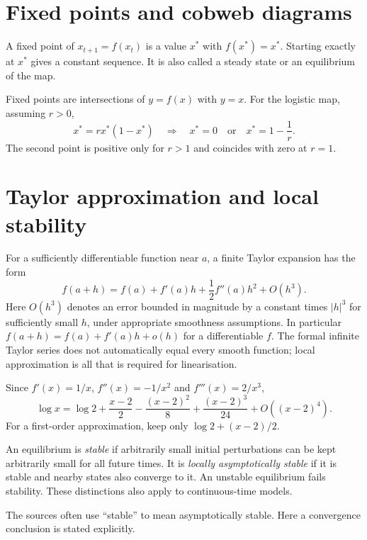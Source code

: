 \section{Fixed points and cobweb diagrams}
\begin{definition}
A fixed point of $x_{t+1}=f(x_t)$ is a value $x^*$ with $f(x^*)=x^*$.
Starting exactly at $x^*$ gives a constant sequence. It is also called a
steady state or an equilibrium of the map.
\end{definition}
Fixed points are intersections of $y=f(x)$ with $y=x$.
For the logistic map, assuming $r>0$,
\[
x^*=rx^*(1-x^*)\quad\Longrightarrow\quad
x^*=0\quad\text{or}\quad x^*=1-\frac1r.
\]
The second point is positive only for $r>1$ and coincides with zero at $r=1$.



\section{Taylor approximation and local stability}
For a sufficiently differentiable function near $a$, a finite Taylor expansion
has the form
\[
f(a+h)=f(a)+f'(a)h+\frac12f''(a)h^2+O(h^3).
\]
Here $O(h^3)$ denotes an error bounded in magnitude by a constant times
$|h|^3$ for sufficiently small $h$, under appropriate smoothness assumptions.
In particular $f(a+h)=f(a)+f'(a)h+o(h)$ for a differentiable $f$.
The formal infinite Taylor series does not automatically equal every smooth
function; local approximation is all that is required for linearisation.

\begin{example}
Since $f'(x)=1/x$, $f''(x)=-1/x^2$ and $f'''(x)=2/x^3$,
\[
\log x=\log2+\frac{x-2}{2}-\frac{(x-2)^2}{8}
+\frac{(x-2)^3}{24}+O((x-2)^4).
\]
For a first-order approximation, keep only $\log2+(x-2)/2$.
\end{example}

\begin{definition}
An equilibrium is \emph{stable} if arbitrarily small initial perturbations
can be kept arbitrarily small for all future times. It is \emph{locally
asymptotically stable} if it is stable and nearby states also converge to it.
An unstable equilibrium fails stability. These distinctions also apply to
continuous-time models.
\end{definition}
The sources often use ``stable'' to mean asymptotically stable. Here a
convergence conclusion is stated explicitly.

